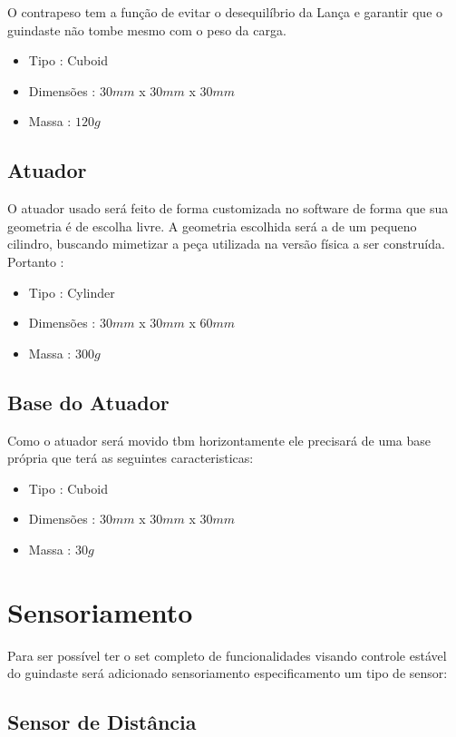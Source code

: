 \documentclass{article}
\begin{document}
        O contrapeso tem a função de evitar o desequilíbrio da Lança e garantir que o guindaste 
        não tombe mesmo com o peso da carga. 
        \begin{itemize}
            \item Tipo : Cuboid
            \item Dimensões : \(30mm\) x \(30mm\) x \(30mm\)
            \item Massa : \(120g\)
        \end{itemize}
    \subsection{Atuador}

        O atuador usado será feito de forma customizada no software de forma que sua geometria é de 
        escolha livre. A geometria escolhida será a de um pequeno cilindro, buscando mimetizar a peça 
        utilizada na versão física a ser construída. Portanto :
        \begin{itemize}
            \item Tipo : Cylinder
            \item Dimensões : \(30mm\) x \(30mm\) x \(60mm\)
            \item Massa : \(300g\)
        \end{itemize}
    \subsection{Base do Atuador}

        Como o atuador será movido tbm horizontamente ele precisará de uma base própria que terá as seguintes caracteristicas:
        \begin{itemize}
            \item Tipo : Cuboid
            \item Dimensões : \(30mm\) x \(30mm\) x \(30mm\)
            \item Massa : \(30g\)
        \end{itemize}
    \section{Sensoriamento}

        Para ser possível ter o set completo de funcionalidades visando controle estável do guindaste será adicionado
        sensoriamento especificamento um tipo de sensor:
        \subsection{Sensor de Distância}
\end{document}

